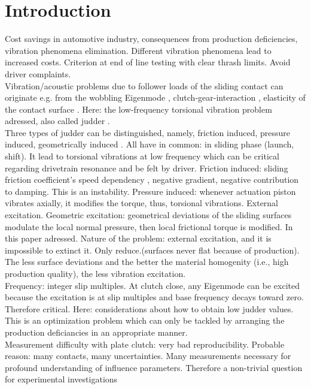 \documentclass[a4paper,fleqn]{cas-dc}
\begin{document}
\section{Introduction}
Cost savings in automotive industry, consequences from production deficiencies, vibration phenomena elimination. Different vibration phenomena lead to increased costs. Criterion at end of line testing with clear thrash limits. Avoid driver complaints. \\
Vibration/acoustic problems due to follower loads of the sliding contact can originate e.g. from the wobbling Eigenmode \cite{fidlin2011minimal,wickramarachi2005analysis}, clutch-gear-interaction \cite{jehle2018nonlinear}, elasticity of the contact surface \cite{hetzler2009moving,jehle2016flexible}. Here: the low-frequency torsional vibration problem adressed, also called judder \cite{klement2011Fahrzeug}.\\
Three types of judder can be distinguished, namely, friction induced, pressure induced, geometrically induced \cite{drexl1990clutch}. All have in common: in sliding phase (launch, shift). It lead to torsional vibrations at low frequency which can be critical regarding drivetrain resonance and be felt by driver. 
Friction induced: sliding friction coefficient's speed dependency \cite{hinrichs1997reibungsschwingungen,kauderer1958nichtlineare}, negative gradient, negative contribution to damping. This is an instability. Pressure induced: whenever actuation piston vibrates axially, it modifies the torque, thus, torsional vibrations. External excitation. 
Geometric excitation: geometrical deviations of the sliding surfaces modulate the local normal pressure, then local frictional torque is modified. In this paper adressed. Nature of the problem: external excitation, and it is impossible to extinct it. Only reduce.(surfaces never flat because of production). The less surface deviations and the better the material homogenity (i.e., high production quality), the less vibration excitation. \\
Frequency: integer slip multiples. At clutch close, any Eigenmode can be excited because the excitation is at slip multiples and base frequency decays toward zero. Therefore critical. Here: considerations about how to obtain low judder values. This is an optimization problem \cite{albers1998Rupfen,dresig2014schwingungen,hausner2012Judder} which can only be tackled by arranging the production deficiancies in an appropriate manner. \\
Measurement difficulty with plate clutch: very bad reproducibility. Probable reason: many contacts, many uncertainties. Many measurements necessary for profound understanding of influence parameters. Therefore a non-trivial question for experimental investigations \cite{ingram2010Clutch} \\
\end{document}
